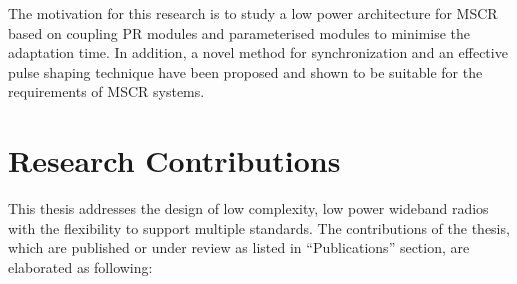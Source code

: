 The motivation for this research is to study a low power architecture for MSCR based on coupling PR modules and parameterised modules to minimise the adaptation time.
In addition, a novel method for synchronization and an effective pulse shaping technique have been proposed and shown to be suitable for the requirements of MSCR systems.
\section{Research Contributions}

This thesis addresses the design of low complexity, low power wideband radios with the flexibility to support multiple standards.
The contributions of the thesis, which are published or under review as listed in  ``Publications'' section, are elaborated as following:

